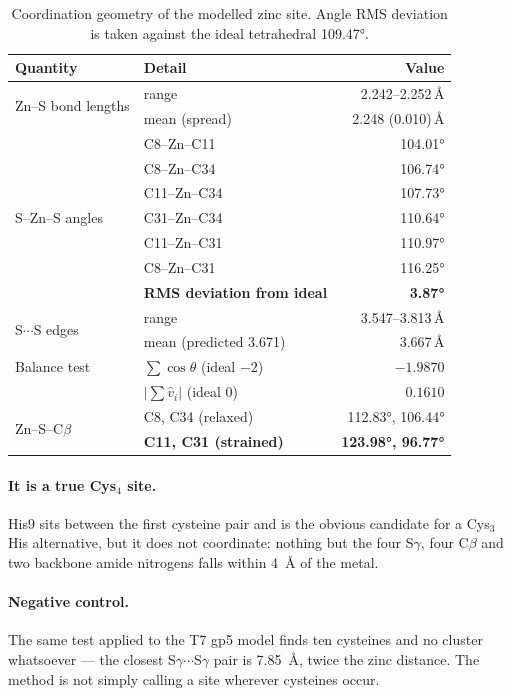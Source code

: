 \documentclass[11pt,a4paper]{article}
\begin{document}
\begin{table}[htbp]
\centering
\caption{Coordination geometry of the modelled zinc site. Angle RMS deviation is
taken against the ideal tetrahedral \ang{109.47}.}
\label{tab:zngeom}
\small
\begin{tabular}{llr}
\toprule
\textbf{Quantity} & \textbf{Detail} & \textbf{Value} \\
\midrule
\multirow{2}{*}{Zn--S bond lengths}
  & range & 2.242--2.252\,\si{\angstrom} \\
  & mean (spread) & 2.248 (0.010)\,\si{\angstrom} \\
\midrule
\multirow{7}{*}{S--Zn--S angles}
  & C8--Zn--C11  & \ang{104.01} \\
  & C8--Zn--C34  & \ang{106.74} \\
  & C11--Zn--C34 & \ang{107.73} \\
  & C31--Zn--C34 & \ang{110.64} \\
  & C11--Zn--C31 & \ang{110.97} \\
  & C8--Zn--C31  & \ang{116.25} \\
  & \textbf{RMS deviation from ideal} & \textbf{\ang{3.87}} \\
\midrule
\multirow{2}{*}{S$\cdots$S edges}
  & range & 3.547--3.813\,\si{\angstrom} \\
  & mean (predicted 3.671) & 3.667\,\si{\angstrom} \\
\midrule
Balance test & $\sum \cos\theta$ (ideal $-2$) & $-1.9870$ \\
             & $|\sum \hat{v}_i|$ (ideal $0$) & $0.1610$ \\
\midrule
\multirow{2}{*}{Zn--S--C$\beta$}
  & C8, C34 (relaxed) & \ang{112.83}, \ang{106.44} \\
  & \textbf{C11, C31 (strained)} & \textbf{\ang{123.98}, \ang{96.77}} \\
\bottomrule
\end{tabular}
\end{table}

\paragraph{It is a true Cys$_4$ site.} His9 sits between the first cysteine pair
and is the obvious candidate for a Cys$_3$His alternative, but it does not
coordinate: nothing but the four S$\gamma$, four C$\beta$ and two backbone amide
nitrogens falls within \SI{4}{\angstrom} of the metal.

\paragraph{Negative control.} The same test applied to the T7 gp5 model finds ten
cysteines and no cluster whatsoever --- the closest S$\gamma\cdots$S$\gamma$ pair
is \SI{7.85}{\angstrom}, twice the zinc distance. The method is not simply
calling a site wherever cysteines occur.
\end{document}
